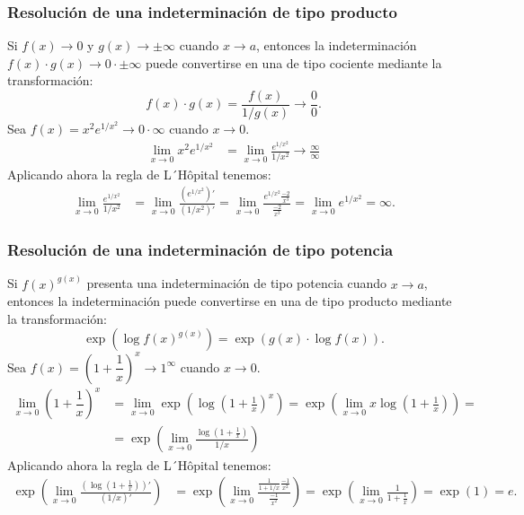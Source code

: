 \begin{frame}
\frametitle{Resolución de una indeterminación de tipo producto}
Si $f(x)\rightarrow 0$ y $g(x)\rightarrow \pm\infty$ cuando $x\rightarrow a$, entonces la indeterminación $f(x)\cdot g(x)\rightarrow 0\cdot \pm\infty$ puede convertirse en una de tipo cociente mediante la transformación:
\[
f(x)\cdot g(x) = \frac{f(x)}{1/g(x)}\rightarrow \frac{0}{0}.
\]
 Sea $f(x)=x^2e^{1/x^2}\rightarrow 0\cdot\infty$ cuando $x\rightarrow 0$.
\begin{align*}
\lim_{x\rightarrow 0}x^2e^{1/x^2} &= \lim_{x\rightarrow 0}\frac{e^{1/x^2}}{1/x^2}\rightarrow \frac{\infty}{\infty}
\end{align*}
Aplicando ahora la regla de L´Hôpital tenemos:
\begin{align*}
\lim_{x\rightarrow 0}\frac{e^{1/x^2}}{1/x^2} &= \lim_{x\rightarrow
0}\frac{\left(e^{1/x^2}\right)'}{\left(1/x^2\right)'} = \lim_{x\rightarrow
0}\frac{e^{1/x^2}\frac{-2}{x^3}}{\frac{-2}{x^3}} = \lim_{x\rightarrow 0}e^{1/x^2}=\infty.
\end{align*}
\end{frame}


\begin{frame}
\frametitle{Resolución de una indeterminación de tipo potencia}
Si $f(x)^{g(x)}$ presenta una indeterminación de tipo potencia cuando $x\rightarrow a$, entonces la indeterminación puede convertirse en una de tipo producto mediante la transformación:
\[
\exp\left(\log f(x)^{g(x)}\right) = \exp\left(g(x)\cdot \log f(x)\right).
\]
 Sea $f(x)=\left(1+\dfrac{1}{x}\right)^{x} \rightarrow 1^\infty$ cuando $x\rightarrow 0$.
\begin{align*}
\lim_{x\rightarrow 0}\left(1+\dfrac{1}{x}\right)^{x} &= \lim_{x\rightarrow
0}\exp\left(\log\left(1+\frac{1}{x}\right)^{x}\right) = \exp\left(\lim_{x\rightarrow
0}x\log\left(1+\frac{1}{x}\right)\right) =\\
&= \exp\left(\lim_{x\rightarrow 0}\frac{\log\left(1+\frac{1}{x}\right)}{1/x}\right)
\end{align*}
Aplicando ahora la regla de L´Hôpital tenemos:
\begin{align*}
\exp\left(\lim_{x\rightarrow 0}\frac{\left(\log\left(1+\frac{1}{x}\right)\right)'}{\left(1/x\right)'}\right) &=
\exp\left(\lim_{x\rightarrow 0}\frac{\frac{1}{1+1/x}\frac{-1}{x^2}}{\frac{-1}{x^2}}\right) =
\exp\left(\lim_{x\rightarrow 0}\frac{1}{1+\frac{1}{x}}\right)=\exp(1)=e.
\end{align*}
\end{frame}


